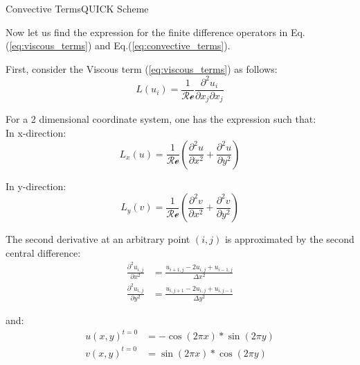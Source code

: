 \documentclass[aspectratio=169, sectionpages, codemintedoverleaf, bibref]{beamer}
\begin{document}
\begin{frame}{Convective Terms}{QUICK Scheme}

	Now let us find the expression for the finite difference operators in Eq.(\ref{eq:viscous_terms}) and Eq.(\ref{eq:convective_terms}).
 
    \prob First, consider the Viscous term (\ref{eq:viscous_terms}) as follows: \begin{equation}
        L (u_i) = \frac{1}{\mathcal{Re}} \frac{\partial^2 u_i}{\partial x_j \partial x_j}
    \end{equation}

    For a 2 dimensional coordinate system, one has the expression such that:
    \\
    In x-direction: \begin{equation}
        L_x (u) = \frac{1}{\mathcal{Re}} \left( \frac{\partial^2 u}{\partial x^2} + \frac{\partial^2 u}{\partial y^2} \right)
    \end{equation}

    In y-direction: \begin{equation}
        L_y (v) = \frac{1}{\mathcal{Re}} \left( \frac{\partial^2 v}{\partial x^2} + \frac{\partial^2 v}{\partial y^2} \right)
    \end{equation}

    \framebreak

    The second derivative at an arbitrary point $(i, j)$ is approximated by the second central difference: \begin{align}
        \frac{\partial^2 u_{i,j}}{\partial x^2} &= \frac{u_{i+1,j} - 2 u_{i,j} + u_{i-1,j}}{\Delta x^2} \\
        \frac{\partial^2 u_{i,j}}{\partial y^2} &= \frac{u_{i,j+1} - 2 u_{i,j} + u_{i,j-1}}{\Delta y^2}
    \end{align}

    and: \begin{align}
        u(x,y)^{t=0} &= - \cos{(2 \pi x)}*\sin{(2 \pi y)} \\
        v(x,y)^{t=0} &= \sin{(2 \pi x)}*\cos{(2 \pi y)}
    \end{align}
        
\end{frame}
\end{document}
